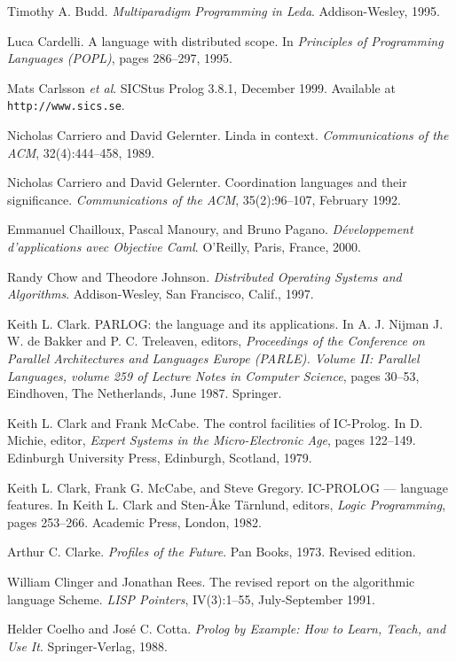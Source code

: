 \begin{thebibliography}{213}
Timothy A. Budd. \emph{Multiparadigm Programming in Leda}. Addison-Wesley, 1995.

Luca Cardelli. A language with distributed scope. In \emph{Principles of Programming Languages (POPL)}, pages 286–297, 1995.

Mats Carlsson \emph{et al}. SICStus Prolog 3.8.1, December 1999. Available at \verb"http://www.sics.se".

Nicholas Carriero and David Gelernter. Linda in context. \emph{Communications of the ACM}, 32(4):444–458, 1989.

Nicholas Carriero and David Gelernter. Coordination languages and their significance. \emph{Communications of the ACM}, 35(2):96–107, February 1992.

Emmanuel Chailloux, Pascal Manoury, and Bruno Pagano. \emph{D\'eveloppement d’applications avec Objective Caml}. O’Reilly, Paris, France, 2000.

Randy Chow and Theodore Johnson. \emph{Distributed Operating Systems and Algorithms}. Addison-Wesley, San Francisco, Calif., 1997.

Keith L. Clark. PARLOG: the language and its applications. In A. J. Nijman J. W. de Bakker and P. C. Treleaven, editors, \emph{Proceedings of the Conference on Parallel Architectures and Languages Europe (PARLE). Volume II: Parallel Languages, volume 259 of Lecture Notes in Computer Science}, pages 30–53, Eindhoven, The Netherlands, June 1987. Springer.

Keith L. Clark and Frank McCabe. The control facilities of IC-Prolog. In D. Michie, editor, \emph{Expert Systems in the Micro-Electronic Age}, pages 122–149. Edinburgh University Press, Edinburgh, Scotland, 1979.

Keith L. Clark, Frank G. McCabe, and Steve Gregory. IC-PROLOG — language features. In Keith L. Clark and Sten-\r{A}ke T\"arnlund, editors, \emph{Logic Programming}, pages 253–266. Academic Press, London, 1982.

Arthur C. Clarke. \emph{Profiles of the Future}. Pan Books, 1973. Revised edition.

William Clinger and Jonathan Rees. The revised report on the algorithmic language Scheme. \emph{LISP Pointers}, IV(3):1–55, July-September 1991.

Helder Coelho and Jos\'e C. Cotta. \emph{Prolog by Example: How to Learn, Teach, and Use It}. Springer-Verlag, 1988.


\end{thebibliography}
